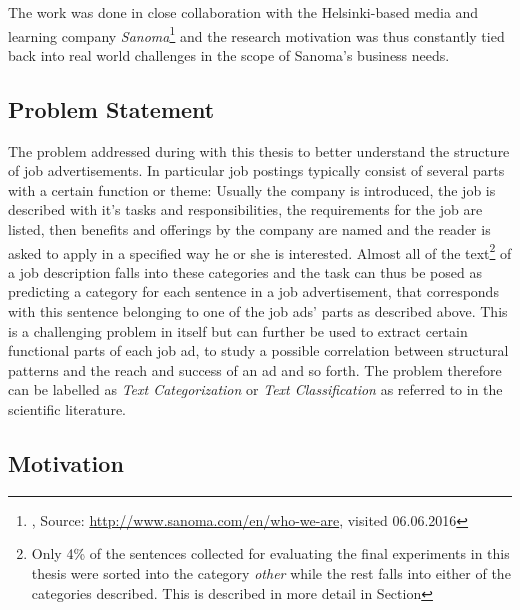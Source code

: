 The work was done in close collaboration with the Helsinki-based media and learning company \emph{Sanoma}\footnote{, Source: \url{http://www.sanoma.com/en/who-we-are}, visited 06.06.2016} and the research motivation was thus constantly tied back into real world challenges in the scope of Sanoma's business needs.

\subsection{Problem Statement}

The problem addressed during with this thesis to better understand the structure of job advertisements. In particular job postings typically consist of several parts with a certain function or theme: Usually the company is introduced, the job is described with it's tasks and responsibilities, the requirements for the job are listed, then benefits and offerings by the company are named and the reader is asked to apply in a specified way he or she is interested.
Almost all of the text\footnote{Only 4\% of the sentences collected for evaluating the final experiments in this thesis were sorted into the category \emph{other} while the rest falls into either of the categories described. This is described in more detail in Section } of a job description falls into these categories and the task can thus be posed as predicting a category for each sentence in a job advertisement, that corresponds with this sentence belonging to one of the job ads' parts as described above.
This is a challenging problem in itself but can further be used to extract certain functional parts of each job ad, to study a possible correlation between structural patterns and the reach and success of an ad and so forth. The problem therefore can be labelled as \emph{Text Categorization} or \emph{Text Classification} as referred to in the scientific literature.


\subsection{Motivation}

